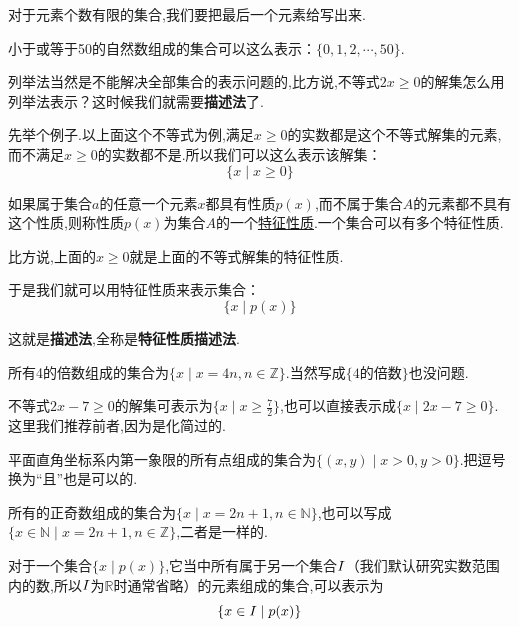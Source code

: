 \documentclass[lang=cn,math=cm,chinesefont=nofont,11pt,scheme=chinese,twocol]{elegantbook}
\begin{document}
对于元素个数有限的集合,我们要把最后一个元素给写出来.
\begin{example}
  小于或等于50的自然数组成的集合可以这么表示：$\{0,1,2,\cdots,50\}$.
\end{example}


列举法当然是不能解决全部集合的表示问题的,比方说,不等式$2x\geq 0$的解集怎么用列举法表示？这时候我们就需要\textbf{描述法}了.

先举个例子.以上面这个不等式为例,满足$x\geq 0$的实数都是这个不等式解集的元素,而不满足$x\geq 0$的实数都不是.所以我们可以这么表示该解集：
$$\{x\mid x\geq0\}$$

\begin{definition}[特征性质]
如果属于集合$a$的任意一个元素$x$都具有性质$p(x)$,而不属于集合$A$的元素都不具有这个性质,则称性质$p(x)$为集合$A$的一个\underline{特征性质}.一个集合可以有多个特征性质.
\end{definition}
比方说,上面的$x\geq 0$就是上面的不等式解集的特征性质.

于是我们就可以用特征性质来表示集合：$$\{x\mid p(x)\}$$

这就是\textbf{描述法},全称是\textbf{特征性质描述法}.

\begin{example}
  所有4的倍数组成的集合为$\{x\mid x=4n,n\in\mathbb{Z}\}$.当然写成$\{\text{4的倍数}\}$也没问题.
\end{example}

\begin{example}
  不等式$2x-7\geq 0$的解集可表示为$\{x\mid x\geq\frac{7}{2}\}$,也可以直接表示成$\{x\mid 2x-7\geq 0\}$.这里我们推荐前者,因为是化简过的.
\end{example}

\begin{example}
  平面直角坐标系内第一象限的所有点组成的集合为$\{(x,y)\mid x>0,y>0\}$.把逗号换为“且”也是可以的.
\end{example}

\begin{example}
  所有的正奇数组成的集合为$\{x\mid x=2n+1,n\in\mathbb{N}\}$,也可以写成$\{x\in\mathbb{N}\mid x=2n+1,n\in\mathbb{Z}\}$,二者是一样的.
\end{example}

\begin{remark}
  对于一个集合$\{x\mid p(x)\}$,它当中所有属于另一个集合$\boldmath{I}$（我们默认研究实数范围内的数,所以$\boldmath{I}$为$\mathbb{R}$时通常省略）的元素组成的集合,可以表示为$$\{x\in\boldmath{I}\mid p(x)\}$$
\end{remark}
\end{document}
